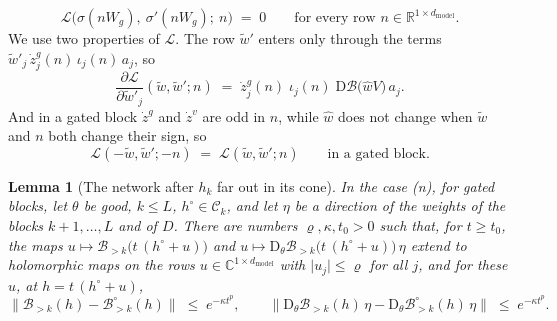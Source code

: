 \documentclass[10pt]{article}
\newtheorem{lemma}[theorem]{Lemma}
\theoremstyle{definition}
\theoremstyle{remark}
\newcommand{\R}{\mathbb{R}}
\newcommand{\dm}{d_{\mathrm{model}}}
\newcommand{\Der}{\mathrm{D}}
\newcommand{\norm}[1]{\lVert #1\rVert}
\begin{document}
\begin{equation}\label{eq:gtstarall}
\mathcal L\big(\sigma(nW_g),\ \sigma'(nW_g);\ n\big) \;=\; 0 \qquad\text{for every row } n \in \R^{1\times\dm} .
\end{equation}
We use two properties of $\mathcal L$. The row $\tilde w'$ enters only through the terms $\tilde w'_j\,\dot z^g_j(n)\,\iota_j(n)\,a_j$, so
\begin{equation}\label{eq:gtLprime}
\frac{\partial\mathcal L}{\partial\tilde w'_j}(\tilde w, \tilde w'; n) \;=\; \dot z^g_j(n)\;\iota_j(n)\;\Der\mathcal B\big(\hat wV\big)\,a_j .
\end{equation}
And in a gated block $\dot z^g$ and $\dot z^v$ are odd in $n$, while $\hat w$ does not change when $\tilde w$ and $n$ both change their sign, so
\begin{equation}\label{eq:gtparity}
\mathcal L(-\tilde w, \tilde w'; -n) \;=\; \mathcal L(\tilde w, \tilde w'; n) \qquad\text{in a gated block.}
\end{equation}

\begin{lemma}[The network after $h_k$ far out in its cone]\label{lem:gtfar}
In the case (n), for gated blocks, let $\theta$ be good, $k \le L$, $h^\circ \in \mathcal C_k$, and let $\eta$ be a direction of the weights of the blocks $k+1, \dots, L$ and of $D$. There are numbers $\varrho, \kappa, t_0 > 0$ such that, for $t \ge t_0$, the maps $u \mapsto \mathcal B_{>k}\big(t\,(h^\circ + u)\big)$ and $u \mapsto \Der_\theta\mathcal B_{>k}\big(t\,(h^\circ + u)\big)\,\eta$ extend to holomorphic maps on the rows $u \in \mathbb C^{1\times\dm}$ with $\lvert u_j\rvert \le \varrho$ for all $j$, and for these $u$, at $h = t\,(h^\circ + u)$,
\[
\norm{\mathcal B_{>k}(h) - \mathcal B^\circ_{>k}(h)} \;\le\; e^{-\kappa t^p}, \qquad \norm{\Der_\theta\mathcal B_{>k}(h)\,\eta - \Der_\theta\mathcal B^\circ_{>k}(h)\,\eta} \;\le\; e^{-\kappa t^p} .
\]
\end{lemma}
\end{document}
